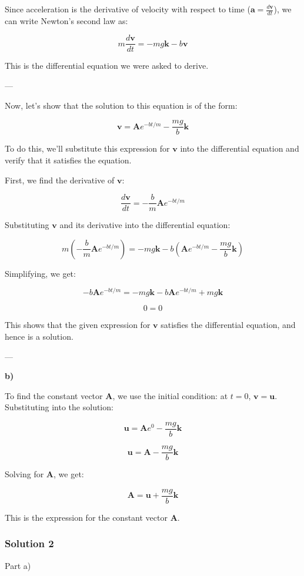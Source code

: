 \documentclass{article}
\begin{document}
Since acceleration is the derivative of velocity with respect to time (\(\mathbf{a} = \frac{d\mathbf{v}}{dt}\)), we can write Newton's second law as:

\[
m \frac{d\mathbf{v}}{dt} = -mg\mathbf{k} - b\mathbf{v}
\]

This is the differential equation we were asked to derive.

---

Now, let's show that the solution to this equation is of the form:

\[
\mathbf{v} = \mathbf{A}e^{-bt/m} - \frac{mg}{b}\mathbf{k}
\]

To do this, we'll substitute this expression for \(\mathbf{v}\) into the differential equation and verify that it satisfies the equation.

First, we find the derivative of \(\mathbf{v}\):

\[
\frac{d\mathbf{v}}{dt} = -\frac{b}{m}\mathbf{A}e^{-bt/m}
\]

Substituting \(\mathbf{v}\) and its derivative into the differential equation:

\[
m \left( -\frac{b}{m}\mathbf{A}e^{-bt/m} \right) = -mg\mathbf{k} - b \left( \mathbf{A}e^{-bt/m} - \frac{mg}{b}\mathbf{k} \right)
\]

Simplifying, we get:

\[
-b\mathbf{A}e^{-bt/m} = -mg\mathbf{k} - b\mathbf{A}e^{-bt/m} + mg\mathbf{k}
\]

\[
0 = 0
\]

This shows that the given expression for \(\mathbf{v}\) satisfies the differential equation, and hence is a solution.

---

\textbf{b)}

To find the constant vector \(\mathbf{A}\), we use the initial condition: at \(t = 0\), \(\mathbf{v} = \mathbf{u}\). Substituting into the solution:

\[
\mathbf{u} = \mathbf{A}e^{0} - \frac{mg}{b}\mathbf{k}
\]

\[
\mathbf{u} = \mathbf{A} - \frac{mg}{b}\mathbf{k}
\]

Solving for \(\mathbf{A}\), we get:

\[
\mathbf{A} = \mathbf{u} + \frac{mg}{b}\mathbf{k}
\]

This is the expression for the constant vector \(\mathbf{A}\).


\subsubsection{Solution 2}
Part a)
\end{document}

